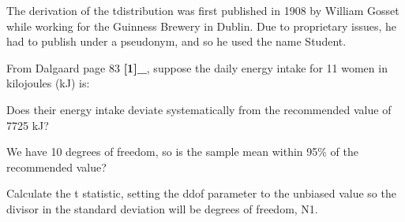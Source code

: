 \documentclass[letterpaper,10pt,english]{sphinxmanual}
\begin{document}
\begin{fulllineitems}
The derivation of the t\sphinxhyphen{}distribution was first published in
1908 by William Gosset while working for the Guinness Brewery
in Dublin. Due to proprietary issues, he had to publish under
a pseudonym, and so he used the name Student.

From Dalgaard page 83 {\color{red}\bfseries{}{[}1{]}\_}, suppose the daily energy intake for 11
women in kilojoules (kJ) is:

\begin{sphinxVerbatim}[commandchars=\\\{\}]
  \PYG{p}{[}        \PYGZbs{}
                     \PYG{p}{]}
\end{sphinxVerbatim}

Does their energy intake deviate systematically from the recommended
value of 7725 kJ?

We have 10 degrees of freedom, so is the sample mean within 95\% of the
recommended value?

\begin{sphinxVerbatim}[commandchars=\\\{\}]
   
\end{sphinxVerbatim}

Calculate the t statistic, setting the ddof parameter to the unbiased
value so the divisor in the standard deviation will be degrees of
freedom, N\sphinxhyphen{}1.


\end{fulllineitems}
\end{document}
